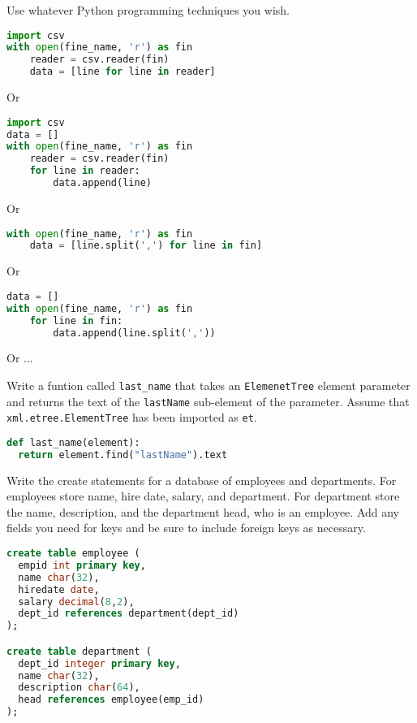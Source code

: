 \documentclass[addpoints,9pt]{exam}
\begin{document}
\begin{questions}
Use whatever Python programming techniques you wish.

\ifprintanswers
\begin{lstlisting}[language=Python]
import csv
with open(fine_name, 'r') as fin
    reader = csv.reader(fin)
    data = [line for line in reader]
\end{lstlisting}
Or
\begin{lstlisting}[language=Python]
import csv
data = []
with open(fine_name, 'r') as fin
    reader = csv.reader(fin)
    for line in reader:
        data.append(line)
\end{lstlisting}
Or
\begin{lstlisting}[language=Python]
with open(fine_name, 'r') as fin
    data = [line.split(',') for line in fin]
\end{lstlisting}
Or
\begin{lstlisting}[language=Python]
data = []
with open(fine_name, 'r') as fin
    for line in fin:
        data.append(line.split(','))
\end{lstlisting}
Or ...
\fi



\newpage

\question[10] Write a funtion called {\tt last\_name} that takes an {\tt ElemenetTree} element parameter and returns the text of the {\tt lastName} sub-element of the parameter.  Assume that {\tt xml.etree.ElementTree} has been imported as {\tt et}.

\ifprintanswers
\begin{lstlisting}[language=Python]
def last_name(element):
  return element.find("lastName").text
\end{lstlisting}
\fi

\newpage

\question[10] Write the create statements for a database of employees and departments.  For employees store name, hire date, salary, and department.  For department store the name, description, and the department head, who is an employee.  Add any fields you need for keys and be sure to include foreign keys as necessary.

\ifprintanswers
\begin{lstlisting}[language=SQL]
create table employee (
  empid int primary key,
  name char(32),
  hiredate date,
  salary decimal(8,2),
  dept_id references department(dept_id)
);

create table department (
  dept_id integer primary key,
  name char(32),
  description char(64),
  head references employee(emp_id)
);
\end{lstlisting}
\fi


\end{questions}
\end{document}
